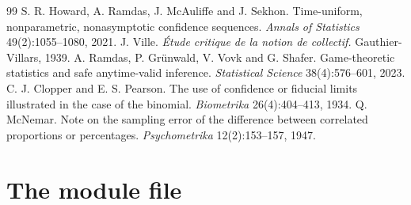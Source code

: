 \documentclass[11pt]{article}
\theoremstyle{definition}
\theoremstyle{plain}
\begin{document}
\begin{thebibliography}{99}
 S. R. Howard, A. Ramdas, J. McAuliffe and J. Sekhon. Time-uniform, nonparametric,
nonasymptotic confidence sequences. \emph{Annals of Statistics} 49(2):1055--1080, 2021.
 J. Ville. \emph{\'Etude critique de la notion de collectif.} Gauthier-Villars, 1939.
 A. Ramdas, P. Gr\"unwald, V. Vovk and G. Shafer. Game-theoretic statistics and
safe anytime-valid inference. \emph{Statistical Science} 38(4):576--601, 2023.
 C. J. Clopper and E. S. Pearson. The use of confidence or fiducial limits
illustrated in the case of the binomial. \emph{Biometrika} 26(4):404--413, 1934.
 Q. McNemar. Note on the sampling error of the difference between correlated
proportions or percentages. \emph{Psychometrika} 12(2):153--157, 1947.
\end{thebibliography}
\clearpage
\appendix
\section{The module file}\label{app:sources}
\end{document}
